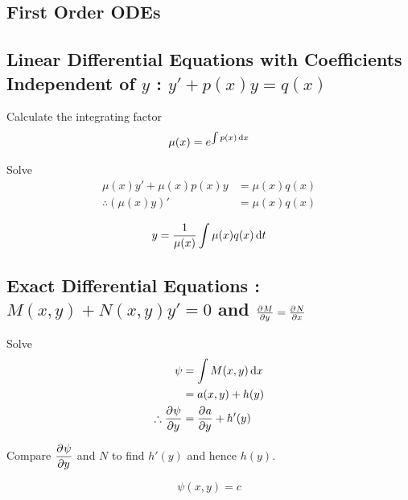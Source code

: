 \documentclass[fleqn, a4paper, 8pt, twoside]{amsart}
\theoremstyle{definition}
\theoremstyle{theorem}
\begin{document}
\begin{multicols}{2}

\begin{spacing}{0.85}

\section{First Order ODEs}

\subsection{Linear Differential Equations with Coefficients Independent of $y$ : $y' + p(x) y = q(x)$}

\begin{algorithmic}[1]
	\item 
		Calculate the integrating factor
		\begin{equation*}
			\mu(x) = e^{\int p(x) \dif x}
		\end{equation*}
	\item 
		Solve
		\begin{align*}
			\mu(x) y' + \mu(x) p(x) y &= \mu(x) q(x)\\
			\therefore \left( \mu(x) y \right)' &= \mu(x) q(x)
		\end{align*}
	\item 
		\begin{equation*}
			y = \frac{1}{\mu(x)} \int \mu(x) q(x) \dif t
		\end{equation*}
\end{algorithmic}

\subsection{Exact Differential Equations : $M(x,y) + N(x,y) y' = 0$ and $\pd{M}{y} = \pd{N}{x}$}

\begin{algorithmic}[1]
	\item 
		Solve
		\begin{align*}
			\psi &= \int M(x,y) \dif x\\
			&= a(x,y) + h(y)\\
			\therefore \dpd{\psi}{y} &= \dpd{a}{y} + h'(y)
		\end{align*}
	\item 
		Compare $\dpd{\psi}{y}$ and $N$ to find $h'(y)$ and hence $h(y)$.
	\item 
		\begin{equation*}
			\psi(x,y) = c
		\end{equation*}
\end{algorithmic}


\end{spacing}
\end{multicols}
\end{document}
